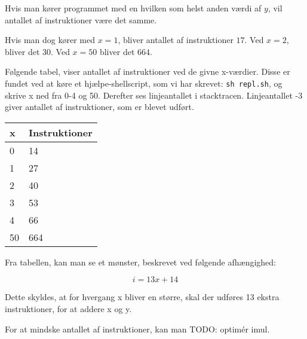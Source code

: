 \documentclass[12pt,a4paper]{article}
\begin{document}
Hvis man kører programmet med en hvilken som helst anden værdi af $y$, vil antallet af instruktioner være det samme.

Hvis man dog kører med $x=1$, bliver antallet af instruktioner $17$. Ved $x=2$, bliver det $30$. Ved $x=50$ bliver det $664$.

Følgende tabel, viser antallet af instruktioner ved de givne x-værdier. Disse er fundet ved at køre et hjælpe-shellscript, som vi har skrevet: \texttt{sh repl.sh}, og skrive x ned fra 0-4 og 50. Derefter ses linjeantallet i stacktracen. Linjeantallet -3 giver antallet af instruktioner, som er blevet udført.

\begin{tabular}{|l|l|}
\hline
x  & Instruktioner \\ \hline
0  & 14  \\ \hline
1  & 27  \\ \hline
2  & 40  \\ \hline
3  & 53  \\ \hline
4  & 66  \\ \hline
50 & 664 \\ \hline

\end{tabular}

Fra tabellen, kan man se et mønster, beskrevet ved følgende afhængighed:

\[
	i = 13x + 14
\]

Dette skyldes, at for hvergang x bliver en større, skal der udføres 13 ekstra instruktioner, for at addere x og y.

For at mindske antallet af instruktioner, kan man TODO: optimér imul.
\end{document}
